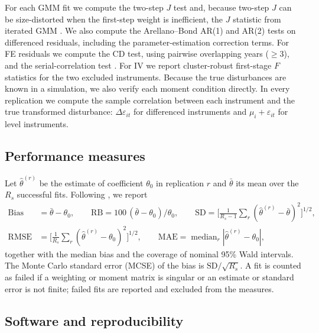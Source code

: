 \documentclass[11pt,a4paper]{article}
\begin{document}
For each GMM fit we compute the two-step \citet{Hansen1982} $J$ test and, because two-step $J$ can be size-distorted when the first-step weight is inefficient, the $J$ statistic from iterated GMM \citep{Hansen1996}. We also compute the Arellano--Bond AR(1) and AR(2) tests on differenced residuals, including the parameter-estimation correction terms. For FE residuals we compute the \citet{Pesaran2015} CD test, using pairwise overlapping years ($\ge3$), and the \citet{Wooldridge2010} serial-correlation test \citep{Drukker2003}. For IV we report cluster-robust first-stage $F$ statistics for the two excluded instruments. Because the true disturbances are known in a simulation, we also verify each moment condition directly. In every replication we compute the sample correlation between each instrument and the true transformed disturbance: $\Delta\varepsilon_{it}$ for differenced instruments and $\mu_i+\varepsilon_{it}$ for level instruments.

\subsection{Performance measures}

Let $\hat\theta^{(r)}$ be the estimate of coefficient $\theta_{0}$ in replication $r$ and $\bar\theta$ its mean over the $R_s$ successful fits. Following \citet{Morris2019}, we report
\begin{equation}\label{eq:metrics}
\begin{aligned}
\text{Bias}&=\bar\theta-\theta_0,\qquad \text{RB}=100\,(\bar\theta-\theta_0)/\theta_0,\qquad
\text{SD}=\Big[\tfrac{1}{R_s-1}\textstyle\sum_r(\hat\theta^{(r)}-\bar\theta)^2\Big]^{1/2},\\
\text{RMSE}&=\Big[\tfrac{1}{R_s}\textstyle\sum_r(\hat\theta^{(r)}-\theta_0)^2\Big]^{1/2},\qquad
\text{MAE}=\operatorname{median}_r|\hat\theta^{(r)}-\theta_0|,
\end{aligned}
\end{equation}
together with the median bias and the coverage of nominal 95\% Wald intervals. The Monte Carlo standard error (MCSE) of the bias is $\text{SD}/\sqrt{R_s}$. A fit is counted as failed if a weighting or moment matrix is singular or an estimate or standard error is not finite; failed fits are reported and excluded from the measures.

\subsection{Software and reproducibility}
\end{document}
